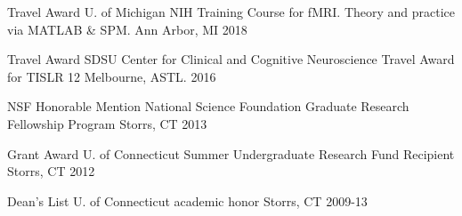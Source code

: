 



\begin{cvhonors}

\iffalse %
\cvhonor
  {Bolded Position}
  {Full Description}
  {Right just Location}
  {YEAR}
  {}
\fi

\cvhonor
  {Travel Award}
  {U. of Michigan NIH Training Course for fMRI. Theory and practice via MATLAB \& SPM.}
  {Ann Arbor, MI}
  {2018}

\cvhonor
  {Travel Award}
  {SDSU Center for Clinical and Cognitive Neuroscience Travel Award for TISLR 12}
  {Melbourne, ASTL.}
  {2016}

\cvhonor
  {NSF Honorable Mention}
  {National Science Foundation Graduate Research Fellowship Program}
  {Storrs, CT}
  {2013}

\cvhonor
  {Grant Award}
  {U. of Connecticut Summer Undergraduate Research Fund Recipient}
  {Storrs, CT}
  {2012}

\cvhonor
  {Dean's List}
  {U. of Connecticut academic honor}
  {Storrs, CT}
  {2009-13}

\end{cvhonors}